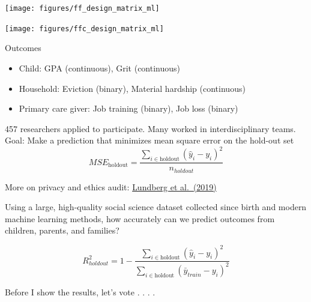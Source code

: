 \documentclass[aspectratio=169]{beamer}
\begin{document}
\begin{frame}

\begin{center}
\end{center}

\end{frame}
\begin{frame}

\begin{center}
\texttt{[image: figures/ff\_design\_matrix\_ml]}
\end{center}

\end{frame}
\begin{frame}

\begin{center}
\texttt{[image: figures/ffc\_design\_matrix\_ml]}
\end{center}

\end{frame}
\begin{frame}

Outcomes
\begin{itemize}
\item Child: GPA (continuous), Grit (continuous)
\item Household:  Eviction (binary), Material hardship (continuous)
\item Primary care giver: Job training (binary), Job loss (binary)
\end{itemize}

\end{frame}
\begin{frame}

457 researchers applied to participate. Many worked in interdisciplinary teams. Goal: Make a prediction that minimizes mean square error on the hold-out set
\begin{equation*}
MSE_{\text{holdout}} = \frac{\sum_{i \in \text{holdout}} (\hat{y}_i - y_i)^2}{n_{holdout}}
\end{equation*}

\vfill
More on privacy and ethics audit: \href{https://doi.org/10.1177/2378023118813023}{Lundberg et al.\ (2019)}
\end{frame}
\begin{frame}

Using a large, high-quality social science dataset collected since birth and modern machine learning methods, how accurately can we predict outcomes from children, parents, and families?

\begin{equation*}
R^2_{holdout} = 1 - \frac{\sum_{i \in \text{holdout}} (\hat{y}_i - y_i)^2}{\sum_{i \in \text{holdout}} (\bar{y}_{train} - y_i)^2}
\end{equation*}

\pause 
\vfill

Before I show the results, let's vote . . . .

\end{frame}
\end{document}

